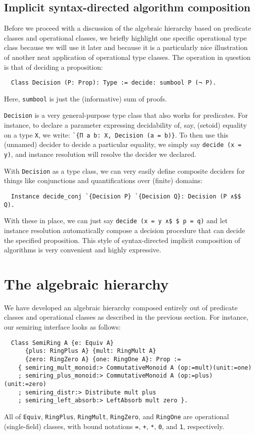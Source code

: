 \documentclass[a4paper,10pt,runningheads]{llncs}
\begin{document}
\subsection{Implicit syntax-directed algorithm composition}

Before we proceed with a discussion of the algebraic hierarchy based on predicate classes and operational classes, we briefly highlight one specific operational type class because we will use it later and because it is a particularly nice illustration of another neat application of operational type classes. The operation in question is that of deciding a proposition:
\begin{lstlisting}
  Class Decision (P: Prop): Type := decide: sumbool P (¬ P).
\end{lstlisting}
Here, \lstinline|sumbool| is just the (informative) sum of proofs.

\lstinline|Decision| is a very general-purpose type class that also works for predicates. For instance, to declare a parameter expressing decidability of, say, (setoid) equality on a type \lstinline|X|, we write: \lstinline|`{Π a b: X, Decision (a = b)}|. To then use this (unnamed) decider to decide a particular equality, we simply say \lstinline|decide (x = y)|, and instance resolution will resolve the decider we declared.

With \lstinline|Decision| as a type class, we can very easily define composite deciders for things like conjunctions and quantifications over (finite) domains:
\begin{lstlisting}
  Instance decide_conj `{Decision P} `{Decision Q}: Decision (P ∧$$ Q).
\end{lstlisting}
With these in place, we can just say \lstinline|decide (x = y ∧$ $ p = q)| and let instance resolution automatically compose a decision procedure that can decide the specified proposition. This style of syntax-directed implicit composition of algorithms is very convenient and highly expressive.

\section{The algebraic hierarchy}\label{classes}

We have developed an algebraic hierarchy composed entirely out of predicate classes and operational classes as described in the previous section. For instance, our semiring interface looks as follows:
\begin{lstlisting}
  Class SemiRing A {e: Equiv A}
      {plus: RingPlus A} {mult: RingMult A}
      {zero: RingZero A} {one: RingOne A}: Prop :=
    { semiring_mult_monoid:> CommutativeMonoid A (op:=mult)(unit:=one)
    ; semiring_plus_monoid:> CommutativeMonoid A (op:=plus)(unit:=zero)
    ; semiring_distr:> Distribute mult plus
    ; semiring_left_absorb:> LeftAbsorb mult zero }.
\end{lstlisting}
All of \lstinline|Equiv|, \lstinline|RingPlus|, \lstinline|RingMult|, \lstinline|RingZero|, and \lstinline|RingOne| are operational (single-field) classes, with bound notations \lstinline|=|, \lstinline|+|, \lstinline|*|, \lstinline|0|, and \lstinline|1|, respectively.
\end{document}
